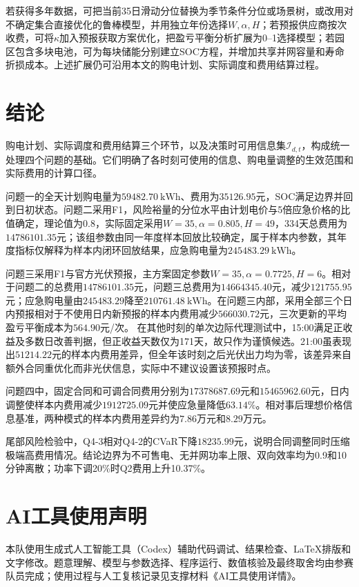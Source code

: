\documentclass[UTF8,12pt,a4paper]{ctexart}
\theoremstyle{remark}
\begin{document}
若获得多年数据，可把当前35日滑动分位替换为季节条件分位或场景树\cite{farzin2017stochastic}，或改用对不确定集合直接优化的鲁棒模型\cite{zugno2015robust,zhang2013robust,alonso2022uncertainty}，并用独立年份选择$W,\alpha,H$；若预报供应商按次收费，可将$\kappa$加入预报获取方案优化，把盈亏平衡分析扩展为0--1选择模型；若园区包含多块电池，可为每块储能分别建立SOC方程，并增加共享并网容量和寿命折损成本。上述扩展仍可沿用本文的购电计划、实际调度和费用结算过程。

\section{结论}
购电计划、实际调度和费用结算三个环节，以及决策时可用信息集$\mathcal I_{d,t}$，构成统一处理四个问题的基础。它们明确了各时刻可使用的信息、购电量调整的生效范围和实际费用的计算口径。

问题一的全天计划购电量为$59482.70\ \mathrm{kWh}$、费用为$35126.95$元，SOC满足边界并回到日初状态。问题二采用F1，风险裕量的分位水平由计划电价与5倍应急价格的比值确定，理论值为$0.8$，实际固定采用$W=35,\alpha=0.805,H=49$，334天总费用为$14786101.35$元；该组参数由同一年度样本回放比较确定，属于样本内参数，其年度指标仅解释为样本内闭环回放结果，应急购电量为$245483.29\ \mathrm{kWh}$。

问题三采用F1与官方光伏预报，主方案固定参数$W=35,\alpha=0.7725,H=6$。相对于问题二的总费用$14786101.35$元，问题三总费用为$14664345.40$元，减少$121755.95$元；应急购电量由$245483.29$降至$210761.48\ \mathrm{kWh}$。在问题三内部，采用全部三个日内预报相对于不使用日内新预报的样本内费用减少$566030.72$元，三次更新的平均盈亏平衡成本为$564.90$元/次。
在其他时刻的单次边际代理测试中，15:00满足正收益及多数日改善判据，但正收益天数仅为171天，故只作为谨慎候选。21:00虽表现出$51214.22$元的样本内费用差异，但全年该时刻之后光伏出力均为零，该差异来自额外合同重优化而非光伏信息，实际中不建议设置该预报时点。

问题四中，固定合同和可调合同费用分别为$17378687.69$元和$15465962.60$元，日内调整使样本内费用减少$1912725.09$元并使应急量降低$63.14\%$。相对事后理想价格信息基准，两种模式的样本内费用差异约为$7.86$万元和$8.29$万元。

尾部风险检验中，Q4-3相对Q4-2的CVaR下降$18235.99$元，说明合同调整同时压缩极端高费用情况。结论边界为不可售电、无并网功率上限、双向效率均为0.9和10分钟离散；功率下调20\%时Q2费用上升10.37\%。

\clearpage
\section*{AI工具使用声明}
本队使用生成式人工智能工具（Codex）辅助代码调试、结果检查、LaTeX排版和文字修改。题意理解、模型与参数选择、程序运行、数值核验及最终取舍均由参赛队员完成；使用过程与人工复核记录见支撑材料《AI工具使用详情》。
\end{document}
